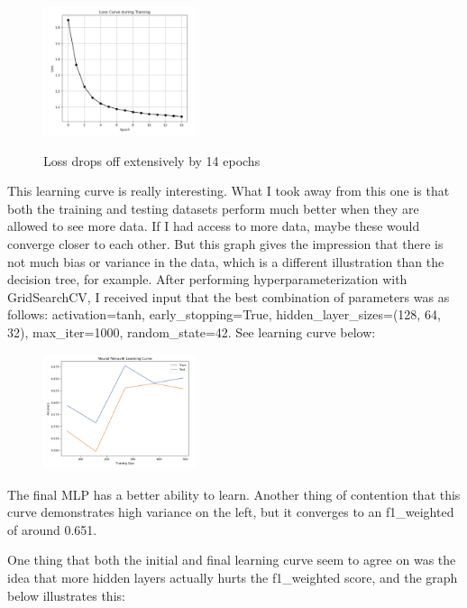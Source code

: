 \documentclass[conference]{IEEEtran}
\begin{document}
\begin{figure}[H]
    \centering
    \includegraphics[width=0.40\textwidth]{PIMA Indian Diabetes Graphs/Neural Nets/nn loss curve.png}
    \label{fig:enter-label}
    \caption{Loss drops off extensively by 14 epochs}
\end{figure}

This learning curve is really interesting. What I took away from this one is that both the training and testing datasets perform much better when they are allowed to see more data. If I had access to more data, maybe these would converge closer to each other. But this graph gives the impression that there is not much bias or variance in the data, which is a different illustration than the decision tree, for example. After performing hyperparameterization with GridSearchCV, I received input that the best combination of parameters was as follows: {activation=tanh}, {early\_stopping=True}, {hidden\_layer\_sizes=(128, 64, 32)}, {max\_iter=1000}, {random\_state=42}. See learning curve below:

\begin{figure}[H]
    \centering
    \includegraphics[width=0.40\textwidth]{PIMA Indian Diabetes Graphs/Neural Nets/nn fin lc.png}
    \label{fig:enter-label}
\end{figure}

The final MLP has a better ability to learn. Another thing of contention that this curve demonstrates high variance on the left, but it converges to an f1\_weighted of around 0.651. 

One thing that both the initial and final learning curve seem to agree on was the idea that more hidden layers actually hurts the f1\_weighted score, and the graph below illustrates this:
\end{document}
